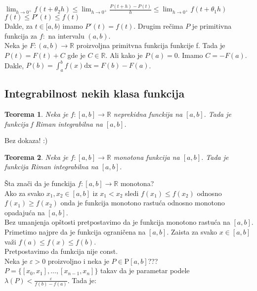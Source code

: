 \documentclass{article}
\newtheorem{teorema}{Teorema}[section]
\begin{document}
$\displaystyle \lim_{h\longrightarrow 0^+} f(t+\theta_2h) \leq \lim_{h\longrightarrow 0^+} \frac{P(t + h) - P(t)}{h} \leq \lim_{h\longrightarrow 0^+} f(t+\theta_1h)$\\
$f(t) \leq P'(t) \leq f(t)$\\
Dakle, za $t \in [a, b)$ imamo $P'(t) = f(t)$. Drugim rečima $P$ je primitivna funkcija za $f:$ na intervalu $(a, b)$.\\
Neka je $F: (a, b) \longrightarrow \mathbb{R}$ proizvoljna primitvna funkcija funkcije f. Tada je $P(t) = F(t) + C$ gde je $C \in \mathbb{R}$. Ali kako je $P(a) = 0$. Imamo $C = -F(a)$.\\
Dakle, $P(b) = \displaystyle \int^b_a f(x) \text{dx} = F(b) - F(a)$.
\subsection{Integrabilnost nekih klasa funkcija}
\begin{teoremabox}
    \begin{teorema}
        Neka je $f: [a, b] \longrightarrow \mathbb{R}$ neprekidna funckija na $[a, b]$. Tada je funkcija f Riman integrabilna na $[a, b]$.
    \end{teorema}
    Bez dokaza! :)
\end{teoremabox}
\begin{teoremabox}
    \begin{teorema}
        Neka je $f: [a, b] \longrightarrow \mathbb{R}$ monotona funkcija na $[a, b]$. Tada je funkcija Riman integrabilna na $[a, b]$.
    \end{teorema}
\end{teoremabox}
Šta znači da je funckija $f:[a, b] \longrightarrow \mathbb{R}$ monotona?\\
Ako za svako $x_1, x_2 \in [a, b]$ iz $x_1 < x_2$ sledi $f(x_1) \leq f(x_2)$ odnosno $f(x_1) \geq f(x_2)$ onda je funkcija monotono rastuća odnosno monotono opadajuća na $[a, b]$.\\
Bez umanjenja opštosti pretpostavimo da je funkcija monotono rastuća na $[a, b]$. Primetimo najpre da je funkcija ograničena na $[a,b]$. Zaista za svako $x \in [a, b]$ važi $f(a) \leq f(x) \leq f(b)$.\\
Pretpostavimo da funkcija nije const.\\
Neka je $\varepsilon > 0$ proizvoljno i neka je $P \in \text{P}[a, b]$??? $P =\{[x_0, x_1], ..., [x_{n-1}, x_n]\}$ takav da je parametar podele $\lambda(P) < \frac{\varepsilon}{f(b) - f(a)}$. Tada je: \\
\end{document}
